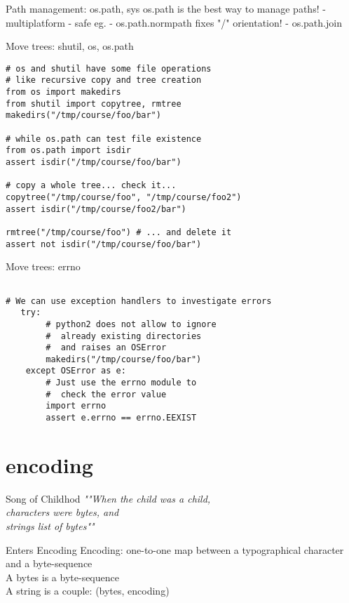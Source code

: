 \documentclass{beamer}[10]
\begin{document}
\begin{frame}[fragile]{Path management: os.path, sys}
os.path is the best way to manage paths!
 - multiplatform
 - safe
eg. 
 - os.path.normpath fixes "/" orientation!
 - os.path.join 
\end{frame}

\begin{frame}[fragile]{Move trees: shutil, os, os.path}
\begin{verbatim}
# os and shutil have some file operations
# like recursive copy and tree creation
from os import makedirs			 
from shutil import copytree, rmtree 
makedirs("/tmp/course/foo/bar")

# while os.path can test file existence
from os.path import isdir			 
assert isdir("/tmp/course/foo/bar")

# copy a whole tree... check it...
copytree("/tmp/course/foo", "/tmp/course/foo2") 
assert isdir("/tmp/course/foo2/bar")			

rmtree("/tmp/course/foo") # ... and delete it
assert not isdir("/tmp/course/foo/bar")
\end{verbatim}
\end{frame}

\begin{frame}[fragile]{Move trees: errno}
\begin{verbatim}

# We can use exception handlers to investigate errors
   try:
        # python2 does not allow to ignore
        #  already existing directories
        #  and raises an OSError
        makedirs("/tmp/course/foo/bar")
    except OSError as e:
        # Just use the errno module to
        #  check the error value
        import errno
        assert e.errno == errno.EEXIST
\end{verbatim}
\end{frame}

\section{encoding}
\begin{frame}{Song of Childhod}
\emph{""When the child was a child,\\
characters were bytes, and\\
strings list of bytes""}
\end{frame}

\begin{frame}{Enters Encoding}
Encoding: one-to-one map between a typographical character and a byte-sequence
\\
A bytes is a byte-sequence
\\
A string is a couple: (bytes, encoding)
\end{frame}
\end{document}
